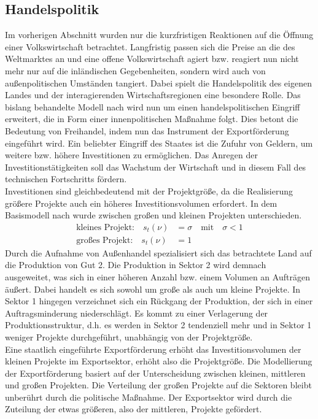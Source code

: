 \subsection{Handelspolitik}\label{sec:Handelspolitik}
Im vorherigen Abschnitt wurden nur die kurzfristigen Reaktionen auf die Öffnung einer Volkswirtschaft betrachtet. Langfristig passen sich die Preise an die des Weltmarktes an und eine offene Volkswirtschaft agiert bzw. reagiert nun nicht mehr nur auf die inländischen Gegebenheiten, sondern wird auch von außenpolitischen Umständen tangiert. Dabei spielt die Handelspolitik des eigenen Landes und der interagierenden Wirtschaftsregionen eine besondere Rolle. Das bislang behandelte Modell nach \cite{Acemoglu.2006} wird nun um einen handelspolitischen Eingriff erweitert, die in Form einer innenpolitischen Maßnahme folgt. Dies betont die Bedeutung von Freihandel, indem nun das Instrument der Exportförderung eingeführt wird. Ein beliebter Eingriff des Staates ist die Zufuhr von Geldern, um weitere bzw. höhere Investitionen zu ermöglichen. Das Anregen der Investitionstätigkeiten soll das Wachstum der Wirtschaft und in diesem Fall des technischen Fortschritts fördern.\\
%
Investitionen sind gleichbedeutend mit der Projektgröße, da die Realisierung größere Projekte auch ein höheres Investitionsvolumen erfordert. In dem Basismodell nach \cite{Acemoglu.2006} wurde zwischen großen und kleinen Projekten unterschieden. 
%
	\begin{align*}
		\text{kleines Projekt:}\quad s_t(\nu) &= \sigma\quad \text{mit}\quad\sigma < 1 \\
		\text{großes Projekt:}\quad s_t(\nu) &= 1
	\end{align*}
%
Durch die Aufnahme von Außenhandel spezialisiert sich das betrachtete Land auf die Produktion von Gut 2. Die Produktion in Sektor 2 wird demnach ausgeweitet, was sich in einer höheren Anzahl bzw. einem Volumen an Aufträgen äußert. Dabei handelt es sich sowohl um große als auch um kleine Projekte. In Sektor 1 hingegen verzeichnet sich ein Rückgang der Produktion, der sich in einer Auftragsminderung niederschlägt. Es kommt zu einer Verlagerung der Produktionsstruktur, d.h. es werden in Sektor 2 tendenziell mehr und in Sektor 1 weniger Projekte durchgeführt, unabhängig von der Projektgröße.\\
%
Eine staatlich eingeführte Exportförderung erhöht das Investitionsvolumen der kleinen Projekte im Exportsektor, erhöht also die Projektgröße. Die Modellierung der Exportförderung basiert auf der Unterscheidung zwischen kleinen, mittleren und großen Projekten. Die Verteilung der großen Projekte auf die Sektoren bleibt unberührt durch die politische Maßnahme. Der Exportsektor wird durch die Zuteilung der etwas größeren, also der mittleren, Projekte gefördert.  
